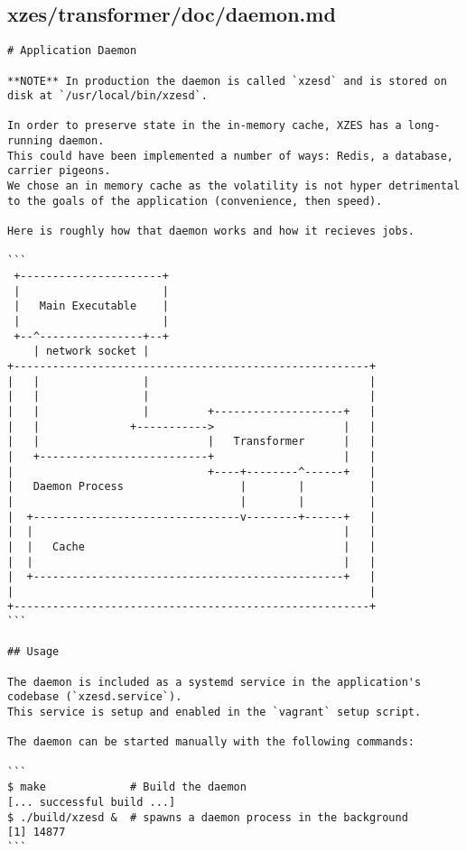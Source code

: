 \subsection{xzes/transformer/doc/daemon.md}
\begin{lstlisting}[caption={Documentation about the application daemon code.}]
# Application Daemon

**NOTE** In production the daemon is called `xzesd` and is stored on disk at `/usr/local/bin/xzesd`.

In order to preserve state in the in-memory cache, XZES has a long-running daemon.
This could have been implemented a number of ways: Redis, a database, carrier pigeons.
We chose an in memory cache as the volatility is not hyper detrimental to the goals of the application (convenience, then speed).

Here is roughly how that daemon works and how it recieves jobs.

```
 +----------------------+
 |                      |
 |   Main Executable    |
 |                      |
 +--^----------------+--+
    | network socket |
+-------------------------------------------------------+
|   |                |                                  |
|   |                |                                  |
|   |                |         +--------------------+   |
|   |              +----------->                    |   |
|   |                          |   Transformer      |   |
|   +--------------------------+                    |   |
|                              +----+--------^------+   |
|   Daemon Process                  |        |          |
|                                   |        |          |
|  +--------------------------------v--------+------+   |
|  |                                                |   |
|  |   Cache                                        |   |
|  |                                                |   |
|  +------------------------------------------------+   |
|                                                       |
+-------------------------------------------------------+
```

## Usage

The daemon is included as a systemd service in the application's codebase (`xzesd.service`).
This service is setup and enabled in the `vagrant` setup script.

The daemon can be started manually with the following commands:

```
$ make             # Build the daemon
[... successful build ...]
$ ./build/xzesd &  # spawns a daemon process in the background
[1] 14877
```


\end{lstlisting}
